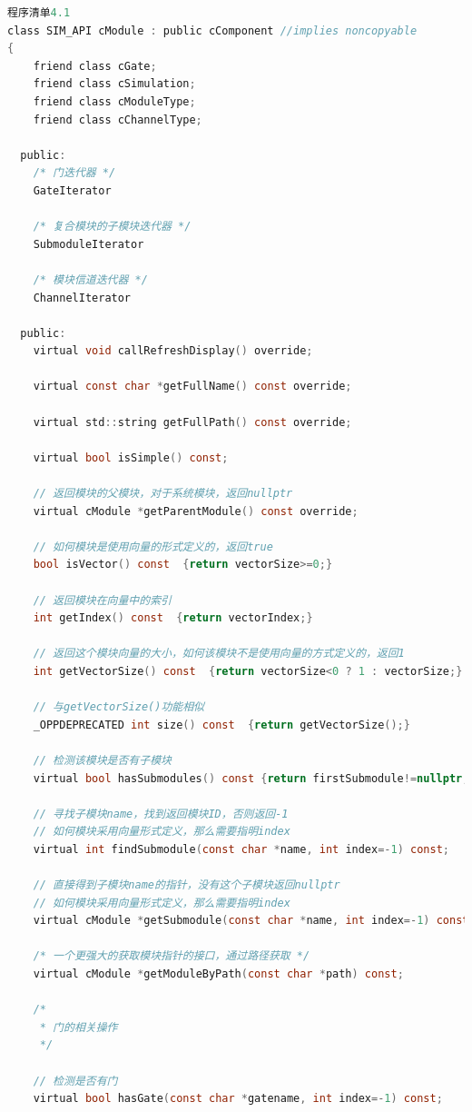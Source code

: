 \begin{lstlisting}[language=c]
程序清单4.1
class SIM_API cModule : public cComponent //implies noncopyable
{
    friend class cGate;
    friend class cSimulation;
    friend class cModuleType;
    friend class cChannelType;

  public:
    /* 门迭代器 */
    GateIterator

    /* 复合模块的子模块迭代器 */
    SubmoduleIterator

    /* 模块信道迭代器 */
    ChannelIterator

  public:
    virtual void callRefreshDisplay() override;

    virtual const char *getFullName() const override;

    virtual std::string getFullPath() const override;

    virtual bool isSimple() const;

    // 返回模块的父模块，对于系统模块，返回nullptr
    virtual cModule *getParentModule() const override;

    // 如何模块是使用向量的形式定义的，返回true
    bool isVector() const  {return vectorSize>=0;}

    // 返回模块在向量中的索引
    int getIndex() const  {return vectorIndex;}

    // 返回这个模块向量的大小，如何该模块不是使用向量的方式定义的，返回1
    int getVectorSize() const  {return vectorSize<0 ? 1 : vectorSize;}

    // 与getVectorSize()功能相似
    _OPPDEPRECATED int size() const  {return getVectorSize();}

    // 检测该模块是否有子模块
    virtual bool hasSubmodules() const {return firstSubmodule!=nullptr;}

    // 寻找子模块name，找到返回模块ID，否则返回-1
    // 如何模块采用向量形式定义，那么需要指明index
    virtual int findSubmodule(const char *name, int index=-1) const;

    // 直接得到子模块name的指针，没有这个子模块返回nullptr
    // 如何模块采用向量形式定义，那么需要指明index
    virtual cModule *getSubmodule(const char *name, int index=-1) const;

    /* 一个更强大的获取模块指针的接口，通过路径获取 */
    virtual cModule *getModuleByPath(const char *path) const;

    /*
     * 门的相关操作
     */

    // 检测是否有门
    virtual bool hasGate(const char *gatename, int index=-1) const;


\end{lstlisting}

